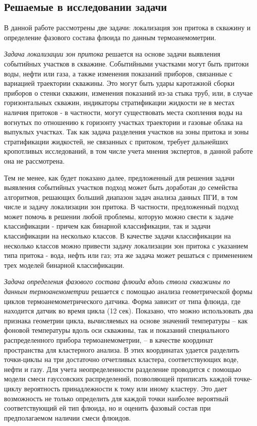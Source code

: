 \subsection{Решаемые в исследовании задачи}
\par
В данной работе рассмотрены две задачи: локализация зон притока в скважину и определение фазового состава флюида по данным термоанемометрии. 
\par
\textit{Задача локализации зон притока} решается на основе задачи выявления событийных участков в скважине. Событийными участками могут быть притоки воды, нефти или газа, а также изменения показаний приборов, связанные с вариацией траектории скважины. Это могут быть удары каротажной сборки приборов о стенки скважин, изменения показаний из-за стыка труб, или, в случае горизонтальных скважин, индикаторы стратификации жидкости не в местах наличия притоков - в частности, могут существовать места скопления воды на вогнутых по отношению к горизонту участках траектории и газовые облака на выпуклых участках. Так как задача разделения участков на зоны притока и зоны стратификации жидкостей, не связанных с притоком, требует дальнейших кропотливых исследований, в том числе учета мнения экспертов, в данной работе она не рассмотрена. 
\par
Тем не менее, как будет показано далее, предложенный для решения задачи выявления событийных участков подход может быть доработан до семейства алгоритмов, решающих больший диапазон задач анализа данных ПГИ, в том числе и задачу локализации зон притока. В частности, предложенный подход может помочь в решении любой проблемы, которую можно свести к задаче классификации - причем как бинарной классификации, так и задачи классификации на несколько классов\cite{ws_multiclass}. В качестве задачи классификации на несколько классов можно привести задачу локализации зон притока с указанием типа притока - вода, нефть или газ; эта же задача может решаться с применением трех моделей бинарной классификации. 
\par
\textit{Задача определения фазового состава флюида вдоль ствола скважины по данным термоанемометрии} решается с помощью анализа геометрической формы циклов термоанемометрического датчика. Форма зависит от типа флюида, где находится датчик во время цикла (12 сек). Показано, что можно использовать два признака геометрии цикла, вычисляемых на основе значений температуры – как фоновой температуры вдоль оси скважины, так и показаний специального распределенного прибора термоанемометрии, – в качестве координат пространства для кластерного анализа. В этих координатах удается разделить точки-циклы на три достаточно отчетливых кластера, соответствующих воде, нефти и газу. Для учета неопределенности разделение проводится с помощью модели смеси гауссовских распределений, позволяющей приписать каждой точке-циклу вероятность принадлежности к тому или иному кластеру. Это дает возможность не только определить для каждой точки наиболее вероятный соответствующий ей тип флюида, но и оценить фазовый состав при предполагаемом наличии смеси флюидов.

